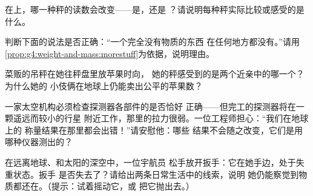 \begin{exercise}[$\star$]\label{exo:g4:weight-and-mass:7}
在上，哪一种秤的读数会改变——是，还是
？请说明每种秤实际比较或感受的是什么。
\end{exercise}

\begin{exercise}[$\star$]\label{exo:g4:weight-and-mass:8}
判断下面的说法是否正确：“一个完全没有物质的东西
在任何地方都没有。”请用
\cref{prop:g4:weight-and-mass:morestuff}为依据，说明理由。
\end{exercise}

\begin{exercise}[$\star$]\label{exo:g4:weight-and-mass:9}
菜贩的吊秤在她往秤盘里放苹果时向，
她的秤感受到的是两个近亲中的哪一个？为什么她的
小伎俩在地球上仍能卖出公平的苹果数？
\end{exercise}

\begin{exercise}[$\star\star$]\label{exo:g4:weight-and-mass:10}
一家太空机构必须检查探测器各部件的是否恰好
正确——但完工的探测器将在一颗遥远而较小的行星
附近工作，那里的拉力很弱。一位工程师担心：“我们在地球上的
称量结果在那里都会出错！”请安慰他：哪些
结果不会随之改变，它们是用哪种仪器测出的？
\end{exercise}

\begin{exercise}[$\star\star$]\label{exo:g4:weight-and-mass:11}
在远离地球、和太阳的深空中，一位宇航员
松手放开扳手：它在她手边，处于失重状态。扳手
是否失去了？请给出两条日常生活中的线索，说明
她仍能察觉到物质都还在。（提示：试着摇动它，或
把它抛出去。）
\end{exercise}
